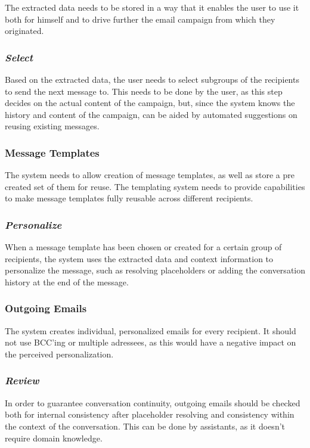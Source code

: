 The extracted data needs to be stored in a way that it enables the user to use it both for himself and to drive further the email campaign from which they originated.

\subsubsection*{\emph{Select}}

Based on the extracted data, the user needs to select subgroups of the recipients to send the next message to. This needs to be done by the user, as this step decides on the actual content of the campaign, but, since the system knows the history and content of the campaign, can be aided by automated suggestions on reusing existing messages.

\subsubsection*{Message Templates}

The system needs to allow creation of message templates, as well as store a pre created set of them for reuse. The templating system needs to provide capabilities to make message templates fully reusable across different recipients.

\subsubsection*{\emph{Personalize}}

When a message template has been chosen or created for a certain group of recipients, the system uses the extracted data and context information to personalize the message, such as resolving placeholders or adding the conversation history at the end of the message.

\subsubsection*{Outgoing Emails}

The system creates individual, personalized emails for every recipient. It should not use BCC’ing or multiple adressees, as this would have a negative impact on the perceived personalization.

\subsubsection*{\emph{Review}}

In order to guarantee conversation continuity, outgoing emails should be checked both for internal consistency after placeholder resolving and consistency within the context of the conversation. This can be done by assistants, as it doesn’t require domain knowledge.

